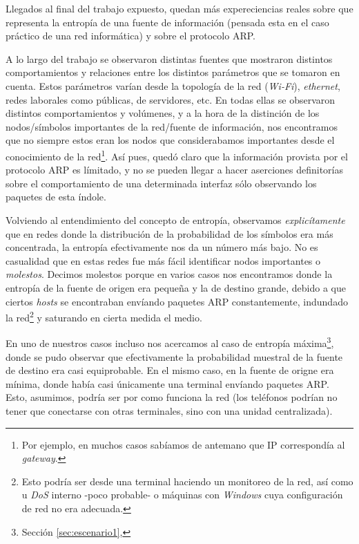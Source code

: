 \par Llegados al final del trabajo expuesto, quedan m\'as expereciencias reales
sobre que representa la entrop\'ia de una fuente de informaci\'on (pensada esta
en el caso pr\'actico de una red inform\'atica) y sobre el protocolo ARP.

\par A lo largo del trabajo se observaron distintas fuentes que mostraron distintos
comportamientos y relaciones entre los distintos par\'ametros que se tomaron en cuenta.
Estos par\'ametros var\'ian desde la topolog\'ia de la red (\textit{Wi-Fi}),
\textit{ethernet}, redes laborales como p\'ublicas, de servidores, etc. En todas ellas
se observaron distintos comportamientos y vol\'umenes, y a la hora de la distinci\'on
de los nodos/s\'imbolos importantes de la red/fuente de informaci\'on, nos encontramos
que no siempre estos eran los nodos que considerabamos importantes desde el conocimiento
de la red\footnote{Por ejemplo, en muchos casos sab\'iamos de antemano que IP correspond\'ia
al \textit{gateway}.}. As\'i pues, qued\'o claro que la informaci\'on provista por
el protocolo ARP es l\'imitado, y no se pueden llegar a hacer aserciones definitor\'ias
sobre el comportamiento de una determinada interfaz s\'olo observando los paquetes
de esta \'indole.

\par Volviendo al entendimiento del concepto de entrop\'ia, observamos \textit{explic\'itamente}
que en redes donde la distribuci\'on de la probabilidad de los s\'imbolos era m\'as concentrada,
la entrop\'ia efectivamente nos da un n\'umero m\'as bajo. No es casualidad que en estas
redes fue m\'as f\'acil identificar nodos importantes o \textit{molestos}. Decimos molestos
porque en varios casos nos encontramos donde la entrop\'ia de la fuente de origen era peque\~na
y la de destino grande, debido a que ciertos \textit{hosts} se encontraban env\'iando
paquetes ARP constantemente, indundado la red\footnote{Esto podr\'ia ser desde una terminal
haciendo un monitoreo de la red, as\'i como u \textit{DoS} interno -poco probable- o m\'aquinas
con \textit{Windows} cuya configuraci\'on de red no era adecuada.} y saturando en cierta
medida el medio.

\par En uno de nuestros casos incluso nos acercamos al caso de entrop\'ia m\'axima\footnote{%
Secci\'on \ref{sec:escenario1}, }, donde se pudo observar que 
efectivamente la probabilidad muestral de la fuente de destino era casi equiprobable. En el mismo caso,
en la fuente de origne era m\'inima, donde hab\'ia casi \'unicamente una terminal env\'iando
paquetes ARP. Esto, asumimos, podr\'ia ser por como funciona la red (los tel\'efonos podr\'ian
no tener que conectarse con otras terminales, sino con una unidad centralizada).

